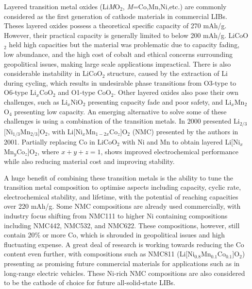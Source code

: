 \documentclass[../main.tex]{subfiles}
\begin{document}
Layered transition metal oxides (Li\textit{M}O$_2$, \textit{M}=Co,Mn,Ni,etc.) are commonly considered as the first generation of cathode materials in commercial LIBs. Theses layered oxides possess a theoretical specific capacity of 270 mAh/g. However, their practical capacity is generally limited to below 200 mAh/g. \cite{myung2017nickel} LiCoO$_2$ held high capacities but the material was problematic due to capacity fading, low abundance, and the high cost of cobalt and ethical concerns surrounding geopolitical issues, making large scale applications impractical. \cite{mo2018impact} There is also considerable instability in LiCoO$_2$ structure, caused by the extraction of Li during cycling, which results in undesirable phase transitions from O3-type to O6-type Li$_x$CoO$_2$ and O1-type CoO$_2$. \cite{goonetilleke2018structural,chen2002staging} Other layered oxides also pose their own challenges, such as Li$_x$NiO$_2$ presenting capacity fade and poor safety, \cite{min2016comparative} and Li$_x$Mn$_2$O$_4$ presenting low capacity. \cite{tian2018performance} An emerging alternative to solve some of these challenges is using a combination of the transition metals. In 2000 \citeauthor{paulsen2000o2} presented Li$_{2/3}$[Ni$_{1/3}$Mn$_{2/3}$]O$_2$, \cite{paulsen2000o2,paulsen20002} with Li[Ni$_x$Mn$_{1-2x}$Co$_z$]O$_2$ (NMC) presented by the authors in 2001. \cite{lu2001layered} Partially replacing Co in LiCoO$_2$ with Ni and Mn to obtain layered Li[Ni$_x$Mn$_y$Co$_z$]O$_2$, \cite{rozier2015li} where $x+y+z=1$, shows improved electrochemical performance while also reducing material cost and improving stability. \cite{ohzuku2001layered}

A huge benefit of combining these transition metals is the ability to tune the transition metal composition to optimise aspects including capacity, cyclic rate, electrochemical stability, and lifetime, with the potential of reaching capacities over 220 mAh/g. \cite{duan2019insights} Some NMC compositions are already used commercially, with industry focus shifting from NMC111 to higher Ni containing compositions including NMC442, NMC532, and NMC622. \cite{zhang2018structural} These compositions, however, still contain 20\% or more Co, which is shrouded in geopolitical issues and high fluctuating expense. A great deal of research is working towards reducing the Co content even further, with compositions such as NMC811 (Li[Ni$_{0.8}$Mn$_{0.1}$Co$_{0.1}$]O$_2$) presenting as promising future commercial materials for applications such as in long-range electric vehicles. \cite{azevedo2018mining} These Ni-rich NMC compositions are also considered to be the cathode of choice for future all-solid-state LIBs. \cite{myung2017nickel}
\end{document}
